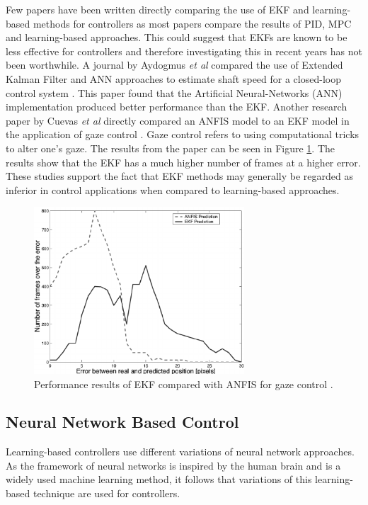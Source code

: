 Few papers have been written directly comparing the use of EKF and learning-based methods for controllers as most papers compare the results of PID, MPC and learning-based approaches. This could suggest that EKFs are known to be less effective for controllers and therefore investigating this in recent years has not been worthwhile. A journal by Aydogmus \textit{et al} compared the use of Extended Kalman Filter and ANN approaches to estimate shaft speed for a closed-loop control system \cite{zain14}. This paper found that the Artificial Neural-Networks (ANN) implementation produced better performance than the EKF. Another research paper by Cuevas \textit{et al} directly compared an ANFIS model to an EKF model in the application of gaze control \cite{zain13}. Gaze control refers to using computational tricks to alter one's gaze. The results from the paper can be seen in Figure \ref{fig:kalman}. The results show that the EKF has a much higher number of frames at a higher error. These studies support the fact that EKF methods may generally be regarded as inferior in control applications when compared to learning-based approaches. 
\begin{figure}[H]
    \centering
    \includegraphics[width = 0.7\textwidth]{img/kalman filter.png}
    \caption[Performance results of EKF compared with ANFIS for gaze control]{Performance results of EKF compared with ANFIS for gaze control \cite{zain13}.}
    \label{fig:kalman}
\end{figure} 
\subsection{Neural Network Based Control}
Learning-based controllers use different variations of neural network approaches. As the framework of neural networks is inspired by the human brain and is a widely used machine learning method,  it follows that variations of this learning-based technique are used for controllers. 

